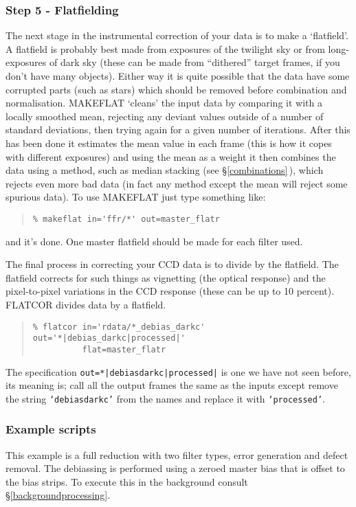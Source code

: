 \documentclass[twoside,11pt]{article}
\newcommand{\hyperref}[4]{#2\ref{#4}#3}
\newcommand{\htmlref}[2]{#1}
\newcommand{\xlabel}[1]{}
\renewcommand{\_}{\texttt{\symbol{95}}}
\newenvironment{myquote}{\begin{quote}\begin{small}}{\end{small}\end{quote}}
\newcommand{\text}[1]{{\small \tt #1}}
\newcommand{\routine}[1]{{\sc #1}}
\newcommand{\xroutine}[1]{\htmlref{{\sc #1}}{#1}}
\begin{document}
\subsubsection{\xlabel{flatfielding}Step 5 - Flatfielding}

The next stage in the instrumental correction of your data is to make
a `flatfield'. A flatfield is probably best made from exposures of the
twilight sky or from long-exposures of dark sky (these can be made
from ``dithered'' target frames, if you don't have many
objects).
Either way it is quite possible that the data have some corrupted
parts (such as stars) which should be removed before combination and
normalisation.
\xroutine{MAKEFLAT} `cleans' the input data by comparing it with a locally
smoothed mean, rejecting any deviant values outside of a number of
standard deviations, then trying again for a given number of
iterations.
After this has been done it estimates the mean value in each frame
(this is how it copes with different exposures) and using the mean as
a weight it then combines the data using a method,
such as median stacking (see
\hyperref{elsewhere}{\S}{\,}{combinations}), which rejects even more bad
data (in fact any method except the mean will reject some spurious
data).
To use \routine{MAKEFLAT} just type something like:
\begin{myquote}
\begin{verbatim}
% makeflat in='ffr/*' out=master_flatr
\end{verbatim}
\end{myquote}
and it's done.
One master flatfield should be made for each filter used.

The final process in correcting your CCD data is to divide by the
flatfield. The flatfield corrects for such things as
vignetting (the optical response) and the pixel-to-pixel variations in
the CCD response (these can be up to 10 percent).
\xroutine{FLATCOR} divides data by a flatfield.
\begin{myquote}
\begin{verbatim}
% flatcor in='rdata/*_debias_darkc' out='*|debias_darkc|processed|'
          flat=master_flatr
\end{verbatim}
\end{myquote}
The specification \text{out=*|debias\_darkc|processed|} is one we
have not seen before, its meaning is; call all the output frames the
same as the inputs except remove the string \text{`debias\_darkc'}
from the names and replace it with \text{`processed'}.

\subsubsection{Example scripts \label{examplescripts}}
This example is a full reduction with two filter types, error
generation and defect removal. The debiassing is performed using a
zeroed master bias that is offset to the bias strips. To execute this
in the background \hyperref{see elsewhere}{consult \S}{}{backgroundprocessing}.
\end{document}
